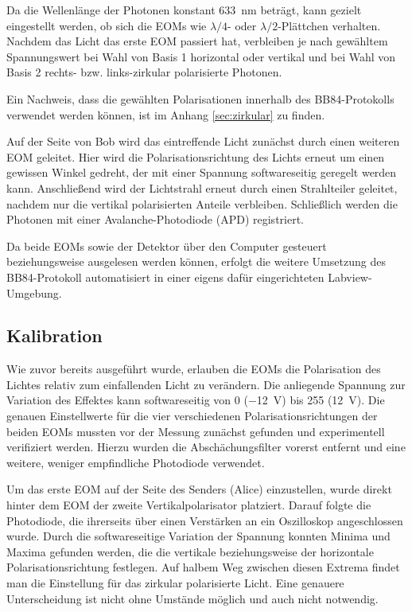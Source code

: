 Da die Wellenlänge der Photonen konstant \SI{633}{nm} beträgt, kann gezielt
eingestellt werden, ob sich die EOMs wie $λ/4$- oder $λ/2$-Plättchen verhalten.
Nachdem das Licht das erste EOM passiert hat, verbleiben je nach gewähltem
Spannungswert bei Wahl von Basis 1 horizontal oder vertikal und bei Wahl von
Basis 2 rechts- bzw. links-zirkular polarisierte Photonen.

Ein Nachweis, dass die gewählten Polarisationen innerhalb des BB84-Protokolls
verwendet werden können, ist im Anhang \ref{sec:zirkular} zu finden.

Auf der Seite von Bob wird das eintreffende Licht zunächst durch einen weiteren
EOM geleitet. Hier wird die Polarisationsrichtung des Lichts erneut um einen
gewissen Winkel gedreht, der mit einer Spannung softwareseitig geregelt werden
kann. Anschließend wird der Lichtstrahl erneut durch einen Strahlteiler
geleitet, nachdem nur die vertikal polarisierten Anteile verbleiben.
Schließlich werden die Photonen mit einer Avalanche-Photodiode (APD)
registriert.

Da beide EOMs sowie der Detektor über den Computer gesteuert beziehungsweise
ausgelesen werden können, erfolgt die weitere Umsetzung des BB84-Protokoll
automatisiert in einer eigens dafür eingerichteten Labview-Umgebung.

\subsection{Kalibration}

Wie zuvor bereits ausgeführt wurde, erlauben die EOMs die Polarisation des
Lichtes relativ zum einfallenden Licht zu verändern. Die anliegende Spannung
zur Variation des Effektes kann softwareseitig von 0 (\SI{-12}{\volt}) bis
255 (\SI{+12}{\volt}). Die genauen Einstellwerte für die vier verschiedenen
Polarisationsrichtungen der beiden EOMs mussten vor der Messung zunächst
gefunden und experimentell verifiziert werden. Hierzu wurden die
Abschächungsfilter vorerst entfernt und eine weitere, weniger empfindliche
Photodiode verwendet.

Um das erste EOM auf der Seite des Senders (Alice) einzustellen, wurde direkt
hinter dem EOM der zweite Vertikalpolarisator platziert. Darauf folgte die
Photodiode, die ihrerseits über einen Verstärken an ein Oszilloskop
angeschlossen wurde. Durch die softwareseitige Variation der Spannung konnten
Minima und Maxima gefunden werden, die die vertikale beziehungsweise der
horizontale Polarisationsrichtung festlegen. Auf halbem Weg zwischen diesen
Extrema findet man die Einstellung für das zirkular polarisierte Licht. Eine
genauere Unterscheidung ist nicht ohne Umstände möglich und auch nicht notwendig.

